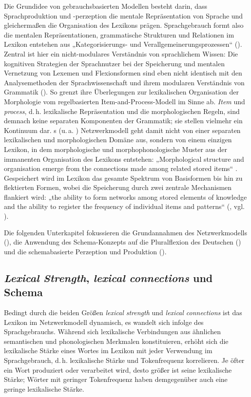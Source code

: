 Die Grundidee von gebrauchsbasierten Modellen besteht darin, dass Sprachproduktion und -perzeption die mentale Repräsentation von Sprache und gleichermaßen die Organisation des Lexikons prägen. Sprachgebrauch formt also die mentalen Repräsentationen, grammatische Strukturen und Relationen im Lexikon entstehen aus „Kategorisierungs- und Verallgemeinerungsprozessen“ (\citealt[48]{BittnerKöpcke2016}). Zentral ist hier ein nicht-modulares Verständnis von sprachlichem Wissen: Die kognitiven Strategien der Sprachnutzer bei der Speicherung und mentalen Vernetzung von Lexemen und Flexionsformen sind eben nicht identisch mit den Analysemethoden der Sprachwissenschaft und ihrem modularen Verständnis von Grammatik (\citealt[49]{BittnerKöpcke2016}). So grenzt \citet[123--125]{Bybee1988} ihre Überlegungen zur lexikalischen Organisation der Morphologie vom regelbasierten Item-and-Process-Modell im Sinne  ab. \textit{Item} und \textit{process}, d.\,h. lexikalische Repräsentation und die morphologischen Regeln, sind demnach keine separaten Komponenten der Grammatik; sie stellen vielmehr ein Kontinuum dar. \citeauthor{Bybee1985b}s (u.\,a. \citeyear{Bybee1985b, Bybee1988, Bybee1995}) Netzwerkmodell geht damit nicht von einer separaten lexikalischen und morphologischen Domäne aus, sondern von einem einzigen Lexikon, in dem morphologische und morphophonologische Muster aus der immanenten Organisation des Lexikons entstehen: „Morphological structure and organisation emerge from the connections made among related stored items“ \citep[452]{Bybee1995}. Gespeichert wird im Lexikon das gesamte Spektrum von Basisformen bis hin zu flektierten Formen, wobei die Speicherung durch zwei zentrale Mechanismen flankiert wird: „the ability to form networks among stored elements of knowledge and the ability to register the frequency of individual items and patterns“ (\citealt[125]{Bybee1988}, vgl. \citealt[427]{Bybee1995}).

Die folgenden Unterkapitel fokussieren die Grundannahmen des Netzwerkmodells (), die Anwendung des Schema-Konzepts auf die Pluralflexion des Deutschen () und die schemabasierte Perzeption und Produktion ().

\subsection{\textit{Lexical Strength}, \textit{lexical connections} und Schema}
\label{sec:5.3.1}
Bedingt durch die beiden Größen \textit{lexical strength} und \textit{lexical connections} ist das Lexikon im Netzwerkmodell dynamisch, es wandelt sich infolge des Sprachgebrauchs. Während sich lexikalische Verbindungen aus ähnlichen semantischen und phonologischen Merkmalen konstituieren, erhöht sich die lexikalische Stärke eines Wortes im Lexikon mit jeder Verwendung im Sprachgebrauch, d.\,h. lexikalische Stärke und Tokenfrequenz korrelieren. Je öfter ein Wort produziert oder verarbeitet wird, desto größer ist seine lexikalische Stärke; Wörter mit geringer Tokenfrequenz haben demgegenüber auch eine geringe lexikalische Stärke.

